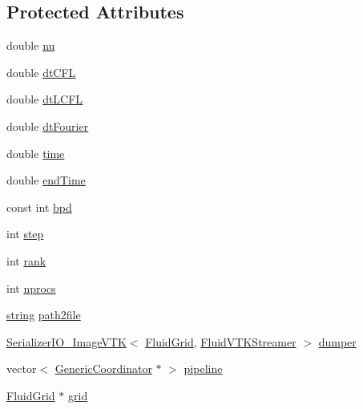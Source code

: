 \subsection*{Protected Attributes}
\begin{DoxyCompactItemize}
\item 
double \hyperlink{class_test_traveling_wave_abaf6f082bc0f5a1d45d227e79f1b5b19}{nu}
\item 
double \hyperlink{class_test_traveling_wave_a24374140412009702060be76ae0a0fd8}{dt\+C\+F\+L}
\item 
double \hyperlink{class_test_traveling_wave_ab4a6af7efe673808d328f9f321712a5c}{dt\+L\+C\+F\+L}
\item 
double \hyperlink{class_test_traveling_wave_accae06119cd97ed5d4da28d530d90512}{dt\+Fourier}
\item 
double \hyperlink{class_test_traveling_wave_ad7688dbdad3bc045057f63600965cd95}{time}
\item 
double \hyperlink{class_test_traveling_wave_ae05f74c2a4d1261481a118fd4ecb706b}{end\+Time}
\item 
const int \hyperlink{class_test_traveling_wave_a311622713a88eb93558ca2fe900f715d}{bpd}
\item 
int \hyperlink{class_test_traveling_wave_ae91c33ae668592277f237a680d837dce}{step}
\item 
int \hyperlink{class_test_traveling_wave_a069c3d638156a0873797cdd07580e39a}{rank}
\item 
int \hyperlink{class_test_traveling_wave_ad5667e7240a4d2a671e9694dd232af7f}{nprocs}
\item 
\hyperlink{testfpzip_8cpp_a984bb8e04129c4268bd6ff36a50c9fa4}{string} \hyperlink{class_test_traveling_wave_a479700ecf44f0c51802ff86ac4f0d13e}{path2file}
\item 
\hyperlink{class_serializer_i_o___image_v_t_k}{Serializer\+I\+O\+\_\+\+Image\+V\+T\+K}$<$ \hyperlink{_definitions_8h_aff3288a3741f5098bcc456bb13440189}{Fluid\+Grid}, \hyperlink{struct_fluid_v_t_k_streamer}{Fluid\+V\+T\+K\+Streamer} $>$ \hyperlink{class_test_traveling_wave_aaf2539a133a189307ec2de32656ecc2f}{dumper}
\item 
vector$<$ \hyperlink{class_generic_coordinator}{Generic\+Coordinator} $\ast$ $>$ \hyperlink{class_test_traveling_wave_a2bc69ad5f58d7c812ba12763d084e5e8}{pipeline}
\item 
\hyperlink{_definitions_8h_aff3288a3741f5098bcc456bb13440189}{Fluid\+Grid} $\ast$ \hyperlink{class_test_traveling_wave_a239ec0ed802b7103b46d324df61a4069}{grid}
\end{DoxyCompactItemize}


